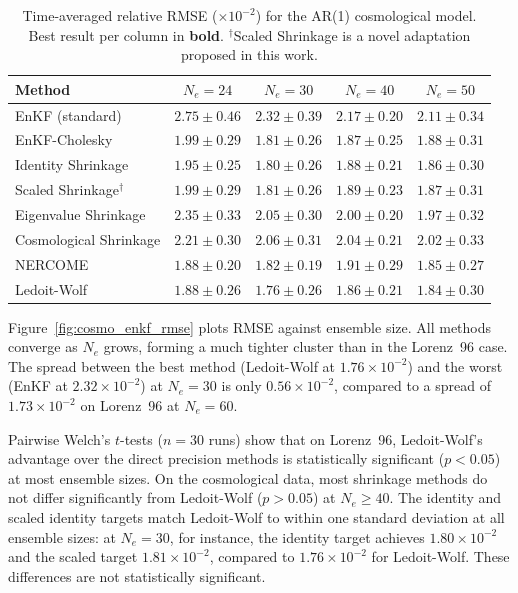 \begin{table}[t]
\centering
\caption{Time-averaged relative RMSE ($\times 10^{-2}$) for the AR(1) cosmological model. Best result per column in \textbf{bold}. $^\dagger$Scaled Shrinkage is a novel adaptation proposed in this work.}
\label{tab:cosmo_enkf}
\begin{tabular}{@{}lcccc@{}}
\toprule
Method & $N_e = 24$ & $N_e = 30$ & $N_e = 40$ & $N_e = 50$ \\
\midrule
EnKF (standard)          & $2.75 \pm 0.46$ & $2.32 \pm 0.39$ & $2.17 \pm 0.20$ & $2.11 \pm 0.34$ \\
EnKF-Cholesky            & $1.99 \pm 0.29$ & $1.81 \pm 0.26$ & $1.87 \pm 0.25$ & $1.88 \pm 0.31$ \\
Identity Shrinkage       & $1.95 \pm 0.25$ & $1.80 \pm 0.26$ & $1.88 \pm 0.21$ & $1.86 \pm 0.30$ \\
Scaled Shrinkage$^\dagger$ & $1.99 \pm 0.29$ & $1.81 \pm 0.26$ & $1.89 \pm 0.23$ & $1.87 \pm 0.31$ \\
Eigenvalue Shrinkage     & $2.35 \pm 0.33$ & $2.05 \pm 0.30$ & $2.00 \pm 0.20$ & $1.97 \pm 0.32$ \\
Cosmological Shrinkage   & $2.21 \pm 0.30$ & $2.06 \pm 0.31$ & $2.04 \pm 0.21$ & $2.02 \pm 0.33$ \\
NERCOME                  & $1.88 \pm 0.20$ & $1.82 \pm 0.19$ & $1.91 \pm 0.29$ & $1.85 \pm 0.27$ \\
Ledoit-Wolf              & $\mathbf{1.88 \pm 0.26}$ & $\mathbf{1.76 \pm 0.26}$ & $\mathbf{1.86 \pm 0.21}$ & $\mathbf{1.84 \pm 0.30}$ \\
\bottomrule
\end{tabular}
\end{table}

Figure~\ref{fig:cosmo_enkf_rmse} plots RMSE against ensemble size. All methods converge as $N_e$ grows, forming a much tighter cluster than in the Lorenz~96 case. The spread between the best method (Ledoit-Wolf at $1.76 \times 10^{-2}$) and the worst (EnKF at $2.32 \times 10^{-2}$) at $N_e = 30$ is only $0.56 \times 10^{-2}$, compared to a spread of $1.73 \times 10^{-2}$ on Lorenz~96 at $N_e = 60$.

Pairwise Welch's $t$-tests ($n = 30$ runs) show that on Lorenz~96, Ledoit-Wolf's advantage over the direct precision methods is statistically significant ($p < 0.05$) at most ensemble sizes. On the cosmological data, most shrinkage methods do not differ significantly from Ledoit-Wolf ($p > 0.05$) at $N_e \geq 40$. The identity and scaled identity targets match Ledoit-Wolf to within one standard deviation at all ensemble sizes: at $N_e = 30$, for instance, the identity target achieves $1.80 \times 10^{-2}$ and the scaled target $1.81 \times 10^{-2}$, compared to $1.76 \times 10^{-2}$ for Ledoit-Wolf. These differences are not statistically significant.

